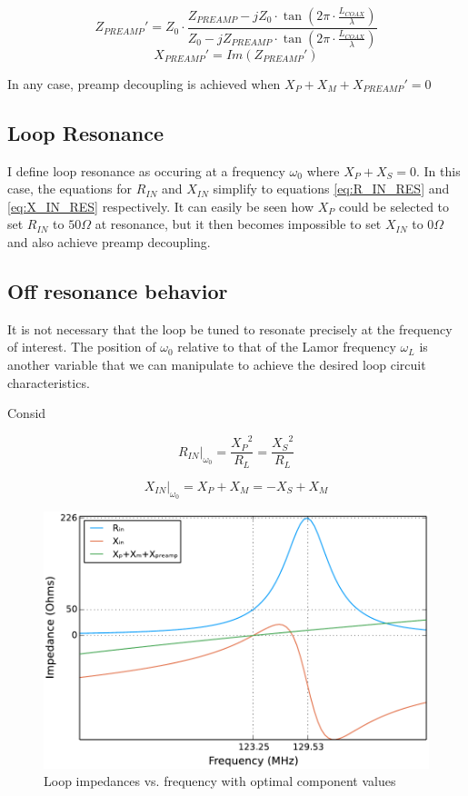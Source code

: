 \begin{equation} \label{eq:Z_PREAMP}
    {Z_{PREAMP}}'=Z_0 \cdot \frac{Z_{PREAMP}-j Z_0 \cdot \tan(2\pi\cdot\frac{L_{COAX}}{\lambda})}{Z_0 - j Z_{PREAMP} \cdot
    \tan(2\pi\cdot\frac{L_{COAX}}{\lambda})}
\end{equation}
\begin{equation} \label{eq:X_PREAMP}
    {X_{PREAMP}}'=Im({Z_{PREAMP}}')
\end{equation}
    
In any case, preamp decoupling is achieved when $X_P+X_M+{X_{PREAMP}}'=0$

\subsection{Loop Resonance}
I define loop resonance as occuring at a frequency $\omega_0$ where $X_P + X_S = 0$. In this case, the equations for $R_{IN}$ and $X_{IN}$ simplify to
equations \ref{eq:R_IN_RES} and \ref{eq:X_IN_RES} respectively. It can easily be seen how $X_P$ could be selected to set
$R_{IN}$ to $50\Omega$ at resonance, but it then becomes impossible to set $X_{IN}$ to $0\Omega$ and also achieve preamp decoupling.

\subsection{Off resonance behavior}
It is not necessary that the loop be tuned to resonate precisely at the frequency of interest. The position of
$\omega_0$ relative to that of the Lamor frequency $\omega_L$ is another variable that we can manipulate to achieve the
desired loop circuit characteristics.

Consid


\begin{equation} \label{eq:R_IN_RES}
    R_{IN}\big|_{\omega_0}=\frac{{X_P}^2}{R_L} = \frac{{X_S}^2}{R_L} 
\end{equation}

\begin{equation} \label{eq:X_IN_RES}
    X_{IN}\big|_{\omega_0}=X_P+X_M=-X_S+X_M
\end{equation}

\begin{figure}
    \includegraphics[width=6in]{figures/impedance_plot.pdf}
    \caption{Loop impedances vs. frequency with optimal component values}
    \label{fig:impedance_plot}
\end{figure}
